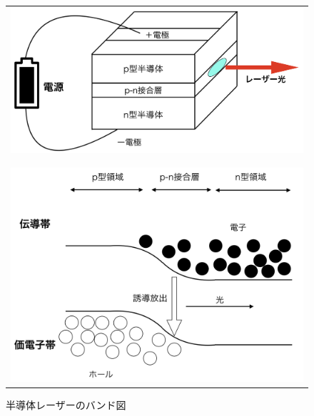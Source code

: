 \documentclass[uplatex, dvipdfmx, a4paper, report, papersize, 11pt]{jsbook}
\begin{document}
\begin{figure}[htpb]
  \centering
    \begin{tabular}{c}


      \begin{minipage}{0.70\hsize}
        \centering
          \includegraphics[keepaspectratio,  scale=0.35,  angle=0]
                          {figures/chapter2/semicon_structure.png}
                          \caption{半導体レーザーの基本構造}
                          \label{semicon_structure}
      \end{minipage}\\
      \\
      \\


      \begin{minipage}{0.70\hsize}
        \centering
          \includegraphics[keepaspectratio,  scale=0.30,  angle=0]
                          {figures/chapter2/semicon_bands.png}
                          \caption{半導体レーザーのバンド図}
                          \label{semicon_bands}
      \end{minipage}

  \end{tabular}
\end{figure}
\newpage
\end{document}
